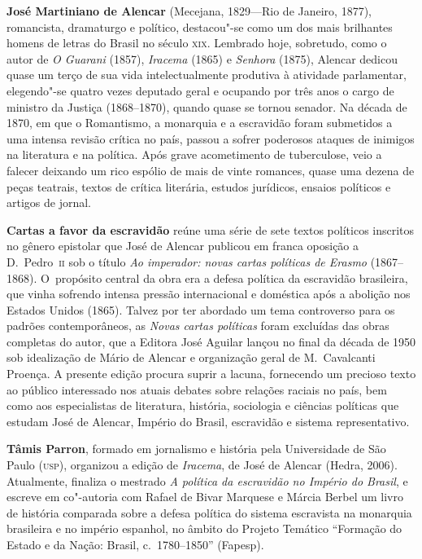 \textbf{José Martiniano de Alencar} (Mecejana, 1829---Rio de Janeiro, 1877), romancista, dramaturgo e político, destacou"-se como um dos mais brilhantes homens de letras do Brasil no século \textsc{xix}. Lembrado hoje, sobretudo, como o autor de \textit{O Guarani} (1857), \textit{Iracema} (1865) e \textit{Senhora} (1875), Alencar dedicou quase um terço de sua vida intelectualmente produtiva à atividade parlamentar, elegendo"-se quatro vezes deputado geral e ocupando por três anos o cargo de ministro da Justiça (1868--1870), quando quase se tornou senador. Na década de 1870, em que o Romantismo, a monarquia e a escravidão foram submetidos a uma intensa revisão crítica no país, passou a sofrer poderosos ataques de inimigos na literatura e na política. Após grave acometimento de tuberculose, veio a falecer deixando um rico espólio de mais de vinte romances, quase uma dezena de peças teatrais, textos de crítica literária, estudos jurídicos, ensaios políticos e artigos de jornal. 

\textbf{Cartas a favor da escravidão} reúne uma série de sete textos políticos inscritos 
no gênero epistolar que José de Alencar publicou em franca oposição a D.~Pedro~\textsc{ii} sob o título \textit{Ao imperador: novas cartas políticas de Erasmo} (1867--1868). \mbox{O propósito} central da obra era a defesa política da escravidão brasileira, que vinha sofrendo intensa pressão internacional e doméstica após a abolição nos Estados Unidos (1865). Talvez por ter abordado um tema controverso para os padrões contemporâneos, as \textit{Novas cartas políticas} foram excluídas das obras completas do autor, que a Editora José Aguilar lançou no final da década de 1950 sob idealização de Mário de Alencar e organização geral de M.~Cavalcanti Proença. A presente edição procura suprir a lacuna, fornecendo um precioso texto ao público interessado nos atuais debates sobre relações raciais no país, bem como aos especialistas de literatura, história, sociologia e ciências políticas que estudam José de Alencar, Império do Brasil, escravidão e sistema representativo.
 
\textbf{Tâmis Parron}, formado em jornalismo e história pela Universidade de São
Paulo (\textsc{usp}), organizou a edição de \textit{Iracema}, de José de Alencar
(Hedra, 2006). Atualmente, finaliza o mestrado \textit{A política da escravidão
no Império do Brasil}, e escreve em co"-autoria com Rafael de Bivar Marquese e
Márcia Berbel um livro de história comparada sobre a defesa política do sistema
escravista na monarquia brasileira e no império espanhol, no âmbito do Projeto
Temático ``Formação do Estado e da Nação: Brasil, c.~1780--1850'' (Fapesp).


